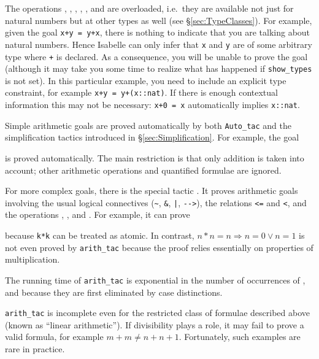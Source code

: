 \begin{warn}
  The operations \ttindexbold{+}, \ttindexbold{-}, \ttindexbold{*},
  , , \ttindexbold{<=} and \ttindexbold{<}
  are overloaded, i.e.\ they are available not just for natural numbers but
  at other types as well (see \S\ref{sec:TypeClasses}). For example, given
  the goal \texttt{x+y = y+x}, there is nothing to indicate that you are
  talking about natural numbers.  Hence Isabelle can only infer that
  \texttt{x} and \texttt{y} are of some arbitrary type where \texttt{+} is
  declared. As a consequence, you will be unable to prove the goal (although
  it may take you some time to realize what has happened if
  \texttt{show_types} is not set).  In this particular example, you need to
  include an explicit type constraint, for example \texttt{x+y = y+(x::nat)}.
  If there is enough contextual information this may not be necessary:
  \texttt{x+0 = x} automatically implies \texttt{x::nat}.
\end{warn}

Simple arithmetic goals are proved automatically by both \texttt{Auto_tac}
and the simplification tactics introduced in \S\ref{sec:Simplification}.  For
example, the goal
\begin{ttbox}
\end{ttbox}
is proved automatically. The main restriction is that only addition is taken
into account; other arithmetic operations and quantified formulae are ignored.

For more complex goals, there is the special tactic . It
proves arithmetic goals involving the usual logical connectives (\verb$~$,
\verb$&$, \verb$|$, \verb$-->$), the relations \texttt{<=} and \texttt{<},
and the operations \ttindexbold{+}, \ttindexbold{-},  and
. For example, it can prove
\begin{ttbox}
\end{ttbox}
because \texttt{k*k} can be treated as atomic.
In contrast, $n*n = n \Longrightarrow n=0 \lor n=1$ is not
even proved by \texttt{arith_tac} because the proof relies essentially on
properties of multiplication.

\begin{warn}
  The running time of \texttt{arith_tac} is exponential in the number of
  occurrences of \ttindexbold{-},  and 
  because they are first eliminated by case distinctions.

  \texttt{arith_tac} is incomplete even for the restricted class of formulae
  described above (known as ``linear arithmetic''). If divisibility plays a
  role, it may fail to prove a valid formula, for example $m+m \neq n+n+1$.
  Fortunately, such examples are rare in practice.
\end{warn}

